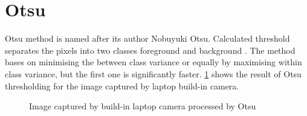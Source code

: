 \begingroup
\renewcommand{\cleardoublepage}{}
\renewcommand{\clearpage}{}
\section{Otsu}
\endgroup
Otsu method is named after its author Nobuyuki Otsu. Calculated threshold separates the pixels into two classes foreground and background \cite{b:otsu}. The method bases on minimising the between class variance or equally by maximising within class variance, but the first one is significantly faster. \figurename{} \ref{fig:otsu_example} shows the result of Otsu thresholding for the image captured by laptop build-in camera.
\begin{figure}[H]
	\begin{center}
	\end{center}
	\caption{Image captured by build-in laptop camera processed by Otsu}
	\label{fig:otsu_example}
\end{figure}

